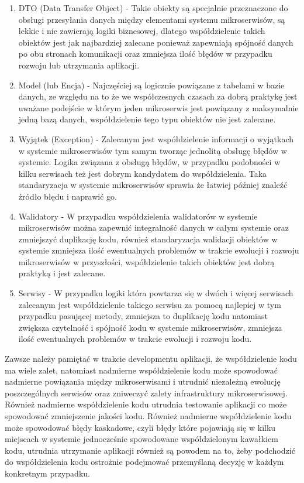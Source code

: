 \documentclass[runningheads,12pt]{llncs}
\begin{document}
\begin{enumerate}
    \item DTO (Data Transfer Object) - Takie obiekty są specjalnie przeznaczone do obsługi przesyłania danych między elementami systemu mikroserwisów, są lekkie i nie zawierają logiki biznesowej, dlatego współdzielenie takich obiektów jest jak najbardziej zalecane ponieważ zapewniają spójność danych po obu stronach komunikacji oraz zmniejsza ilość błędów w przypadku rozwoju lub utrzymania aplikacji.
    \item Model (lub Encja) - Najczęściej są logicznie powiązane z tabelami w bazie danych, ze względu na to że we współczesnych czasach za dobrą praktykę jest uważane podejście w którym jeden mikroserwis jest powiązany z maksymalnie jedną bazą danych, współdzielenie tego typu obiektów nie jest zalecane.
    \item Wyjątek (Exception) - Zalecanym jest współdzielenie informacji o wyjątkach w systemie mikroserwisów tym samym tworząc jednolitą obsługę błędów w systemie. Logika związana z obsługą błędów, w przypadku podobności w kilku serwisach też jest dobrym kandydatem do współdzielenia. Taka standaryzacja w systemie mikroserwisów sprawia że łatwiej później znaleźć źródło błędu i naprawić go.
    \item Walidatory - W przypadku współdzielenia walidatorów w systemie mikroserwisów można zapewnić integralność danych w całym systemie oraz zmniejszyć duplikację kodu, również standaryzacja walidacji obiektów w systemie zmniejsza ilość ewentualnych problemów w trakcie ewolucji i rozwoju mikroserwisów w przyszłości, współdzielenie takich obiektów jest dobrą praktyką i jest zalecane.
    \item Serwisy - W przypadku logiki która powtarza się w dwóch i więcej serwisach zalecanym jest współdzielenie takiego serwisu za pomocą najlepiej w tym przypadku pasującej metody, zmniejsza to duplikację kodu natomiast zwiększa czytelność i spójność kodu w systemie mikroserwisów, zmniejsza ilość ewentualnych problemów w trakcie ewolucji i rozwoju kodu.
\end{enumerate}

Zawsze należy pamiętać w trakcie developmentu aplikacji, że współdzielenie kodu ma wiele zalet, natomiast nadmierne współdzielenie kodu może spowodować nadmierne powiązania między mikroserwisami i utrudnić niezależną ewolucję poszczególnych serwisów oraz zniweczyć zalety infrastruktury mikroserwisowej. Również nadmierne współdzielenie kodu utrudnia testowanie aplikacji co może spowodować zmniejszenie jakości kodu. Również nadmierne współdzielenie kodu może spowodować błędy kaskadowe, czyli błędy które pojawiają się w kilku miejscach w systemie jednocześnie spowodowane współdzielonym kawałkiem kodu, utrudnia utrzymanie aplikacji również są powodem na to, żeby podchodzić do współdzielenia kodu ostrożnie podejmować przemyślaną decyzję w każdym konkretnym przypadku.
\end{document}
